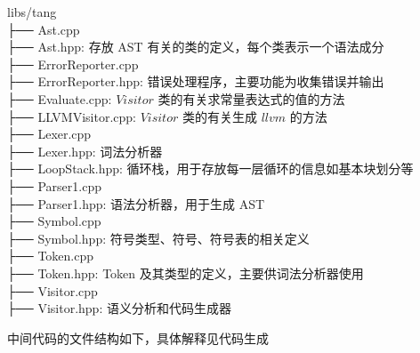 \documentclass[a4paper]{article}
\begin{document}
			\begin{algorithm}[H]
				libs/tang \\
				├── Ast.cpp \\
				├── Ast.hpp: 存放 AST 有关的类的定义，每个类表示一个语法成分 \\
				├── ErrorReporter.cpp \\
				├── ErrorReporter.hpp: 错误处理程序，主要功能为收集错误并输出 \\
				├── Evaluate.cpp: $Visitor$ 类的有关求常量表达式的值的方法 \\
				├── LLVMVisitor.cpp: $Visitor$ 类的有关生成 $llvm$ 的方法 \\
				├── Lexer.cpp \\
				├── Lexer.hpp: 词法分析器 \\
				├── LoopStack.hpp: 循环栈，用于存放每一层循环的信息如基本块划分等 \\
				├── Parser1.cpp \\
				├── Parser1.hpp: 语法分析器，用于生成 AST \\
				├── Symbol.cpp \\
				├── Symbol.hpp: 符号类型、符号、符号表的相关定义 \\
				├── Token.cpp \\
				├── Token.hpp: Token 及其类型的定义，主要供词法分析器使用 \\
				├── Visitor.cpp \\
				├── Visitor.hpp: 语义分析和代码生成器
			\end{algorithm}
			
			中间代码的文件结构如下，具体解释见代码生成
			
\end{document}
